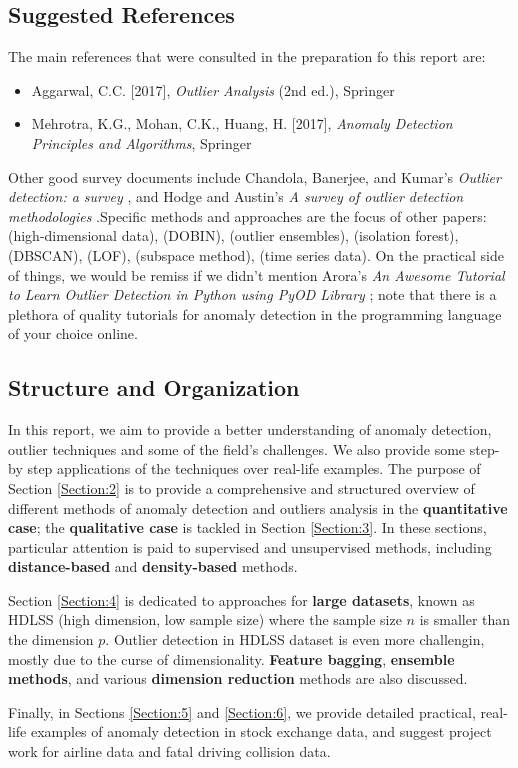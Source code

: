 \subsection{Suggested References}
The main references that were consulted in the preparation fo this report are: 
\begin{itemize}[noitemsep]
\item Aggarwal, C.C. [2017], \textit{Outlier Analysis} (2nd ed.), Springer \cite{A1}
\item Mehrotra, K.G., Mohan, C.K., Huang, H. [2017], \textit{Ano\-ma\-ly Detection Principles and Algorithms}, Springer \cite{A10}
\end{itemize}
Other good survey documents include Chandola, Banerjee, and Kumar's \textit{Outlier detection: a survey} \cite{DP_CBK}, and Hodge and Austin's \textit{A survey of outlier detection methodologies} \cite{DP_HA}.\newl  Specific methods and approaches are the focus of other papers: \cite{AYU,A7,M2} (high-dimensional data), \cite{A6} (DOBIN), \cite{A8} (outlier ensembles), \cite{A15,EIF} (isolation forest), \cite{DBSCAN,HDBSCAN}   (DBSCAN),  \cite{LOF} (LOF), \cite{Zhang,Zi,M1,M3,M4} (subspace method), \cite{chenliu} (time series data). 
\newl On the practical side of things, we would be remiss if we didn't mention Arora's \textit{An Awesome Tutorial to Learn Outlier Detection in Python using PyOD Library} \cite{A11}; note that there is a plethora of quality tutorials for anomaly detection in the programming language of your choice online.
\newpage
\subsection{Structure and Organization}
In this report, we aim to provide a better understanding of anomaly detection, outlier techniques and some of the field's challenges. We also provide some step-by step applications of the techniques over real-life examples.
\newl The purpose of Section \ref{Section:2} is to provide a comprehensive and structured overview of different methods of anomaly detection and outliers analysis in the \textbf{quantitative case}; the \textbf{qualitative case} is tackled in Section \ref{Section:3}. In these sections, particular attention is paid to supervised and unsupervised methods, including \textbf{distance-based} and \textbf{density-based} methods. \par Section \ref{Section:4} is dedicated to approaches for \textbf{large datasets}, known as HDLSS (high dimension, low sample size) where the sample size $n$ is smaller than the dimension $p$. Outlier detection in HDLSS dataset is even more challengin, mostly due to the curse of dimensionality. \textbf{Feature bagging}, \textbf{ensemble methods}, and various \textbf{dimension reduction} methods are also discussed. \par  Finally, in Sections \ref{Section:5} and \ref{Section:6}, we provide detailed practical, real-life examples of anomaly detection in stock exchange data, and suggest project work for airline data and fatal driving collision data.
